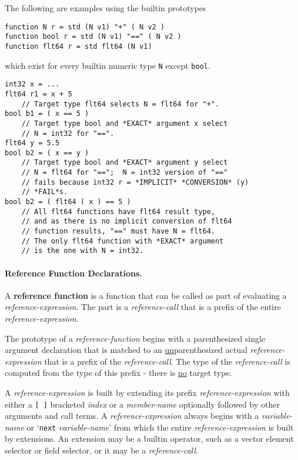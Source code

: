 \documentclass[12pt]{article}
\newcommand{\subsubsubsection}[1]{\paragraph[#1]{#1.}}
\newcommand{\key}[1]{{\rm \bfseries #1}}
\newenvironment{indpar}[1][0.3in]%
	{\begin{list}{}%
		     {\setlength{\itemsep}{0in}%
		      \setlength{\topsep}{0in}%
		      \setlength{\parsep}{1ex}%
		      \setlength{\labelwidth}{#1}%
		      \setlength{\leftmargin}{#1}%
		      \addtolength{\leftmargin}{\labelsep}}%
	 \item}%
	{\end{list}}
\begin{document}
The following are examples using the builtin prototypes
\begin{indpar}
{\tt function N r = std (N v1) "+" ( N v2 )} \\
{\tt function bool r = std (N v1) "==" ( N v2 )} \\
{\tt function flt64 r = std flt64 (N v1)}
\end{indpar}
which exist for every builtin numeric type {\tt N} except
{\tt bool}.
\begin{indpar}[1em]\begin{verbatim}
int32 x = ...
flt64 r1 = x + 5
    // Target type flt64 selects N = flt64 for "+".
bool b1 = ( x == 5 )
    // Target type bool and *EXACT* argument x select
    // N = int32 for "==".
flt64 y = 5.5
bool b2 = ( x == y )
    // Target type bool and *EXACT* argument y select
    // N = flt64 for "==";  N = int32 version of "=="
    // fails because int32 r = *IMPLICIT* *CONVERSION* (y)
    // *FAIL*s.
bool b2 = ( flt64 ( x ) == 5 )
    // All flt64 functions have flt64 result type,
    // and as there is no implicit conversion of flt64
    // function results, "==" must have N = flt64.
    // The only flt64 function with *EXACT* argument
    // is the one with N = int32.
\end{verbatim}\end{indpar}

\subsubsubsection{Reference Function Declarations}
\label{REFERENCE-FUNCTION-DECLARATIONS}

A \key{reference function} is a function that can be
called as part of evaluating a {\em reference-expression}.
The part is a {\em reference-call} that is a prefix of
the entire {\em reference-expression}.

The prototype of a {\em reference-function} begins with
a parenthesized single argument declaration that is matched
to an \underline{un}parenthesized actual {\em reference-expression} that is
a prefix of the {\em reference-call}.  The type of
the {\em reference-call} is computed from the type of
this prefix - there is \underline{no} target type.

A {\em reference-expression} is built by extending its prefix
{\em reference-expression} with either a {\tt [~]} bracketed
{\em index} or a {\em member-name} optionally followed by other
arguments and call terms.
A {\em reference-expression} always begins with a {\em variable-name}
or `{\tt next} {\em variable-name}' from which the entire
{\em reference-expression} is built by extensions.  An extension
may be a builtin operator, such as a vector element selector or
field selector, or it may be a {\em reference-call}.
\end{document}
